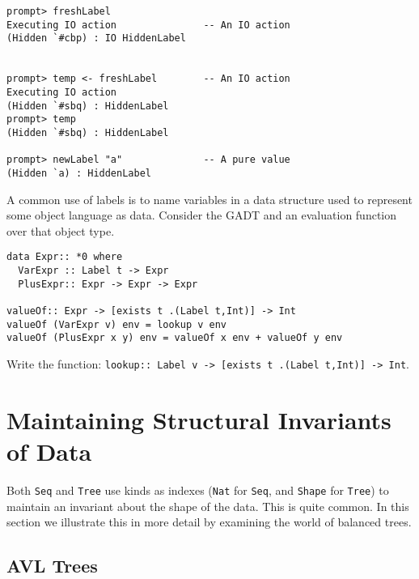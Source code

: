 \documentclass[11pt,twoside,A4]{llncs}
\begin{document}
{\small
\begin{verbatim}
prompt> freshLabel
Executing IO action               -- An IO action
(Hidden `#cbp) : IO HiddenLabel


prompt> temp <- freshLabel        -- An IO action
Executing IO action
(Hidden `#sbq) : HiddenLabel
prompt> temp
(Hidden `#sbq) : HiddenLabel

prompt> newLabel "a"              -- A pure value
(Hidden `a) : HiddenLabel
\end{verbatim}}

\begin{exercise} \label{existVar}
A common use of labels is to name variables in a data structure used
to represent some object language as data. Consider the GADT
and an evaluation function over that object type.

{\small
\begin{verbatim}
data Expr:: *0 where
  VarExpr :: Label t -> Expr
  PlusExpr:: Expr -> Expr -> Expr

valueOf:: Expr -> [exists t .(Label t,Int)] -> Int
valueOf (VarExpr v) env = lookup v env
valueOf (PlusExpr x y) env = valueOf x env + valueOf y env
\end{verbatim}}
\noindent
Write the function: {\small {\tt lookup:: Label v -> [exists t .(Label t,Int)] -> Int}}.
\end{exercise}


\section{Maintaining Structural Invariants of Data}

Both {\tt Seq} and {\tt Tree} use kinds as indexes ({\tt Nat} for {\tt Seq}, and
{\tt Shape} for {\tt Tree}) to maintain an invariant about the shape of the data.
This is quite common. In this section we illustrate this in more detail by
examining the world of balanced trees.

\subsection{AVL Trees}



\end{document}
